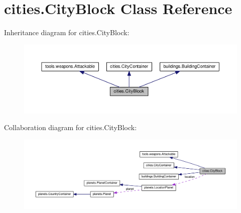 \hypertarget{classcities_1_1_city_block}{}\section{cities.\+City\+Block Class Reference}
\label{classcities_1_1_city_block}


Inheritance diagram for cities.\+City\+Block\+:\nopagebreak
\begin{figure}[H]
\begin{center}
\leavevmode
\includegraphics[width=350pt]{classcities_1_1_city_block__inherit__graph}
\end{center}
\end{figure}


Collaboration diagram for cities.\+City\+Block\+:\nopagebreak
\begin{figure}[H]
\begin{center}
\leavevmode
\includegraphics[width=350pt]{classcities_1_1_city_block__coll__graph}
\end{center}
\end{figure}
